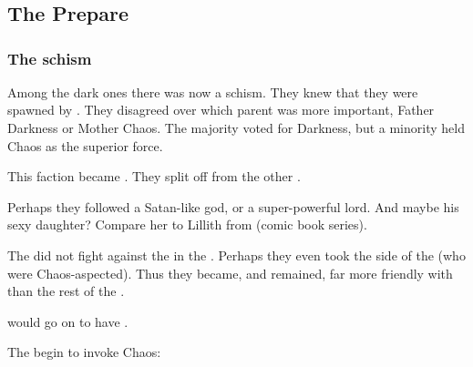 \chapter{\SathariahBook}















\section{The \Resphain Prepare}
\subsection{The \Baelzerach schism}
Among the dark ones there was now a schism. They knew that they were spawned by . They disagreed over which parent was more important, Father Darkness or Mother Chaos. The majority voted for Darkness, but a minority held Chaos as the superior force. 

This faction became \Baelzerach. They split off from the other \resphain. 

Perhaps they followed a Satan-like god, or a super-powerful \resphan{} lord. And maybe his sexy daughter? Compare her to Lillith from  (comic book series). 

The \Baelzerach{} did not fight against the \dragons{} in the \secondbanewar{}. Perhaps they even took the side of the \dragons{} (who were Chaos-aspected). Thus they became, and remained, far more friendly with \dragons{} than the rest of the \resphain. 

\Ishnaruchaefir{} would go on to have . 


The \Baelzerach{} begin to invoke Chaos: 

